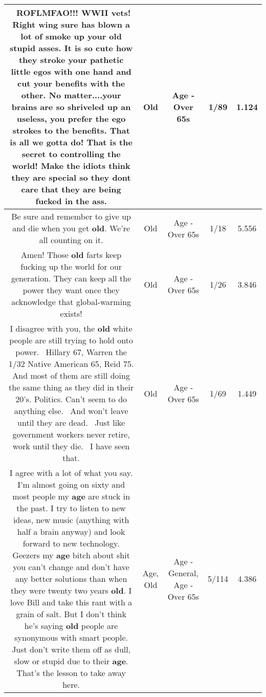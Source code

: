 \documentclass[11pt]{article}
\newlength\mylength
\begin{document}
\begin{center}
\begin{longtable}{|C{.65\mylength}|C{.30\mylength}|C{.12\mylength}|C{.12\mylength}|C{.12\mylength}|}
  \small {} ROFLMFAO!!! WWII vets! Right wing sure has blown a lot of smoke up your \textbf{old} stupid asses. It is so cute how they stroke your pathetic little egos with one hand and cut your benefits with the other. No matter....your brains are so shriveled up an useless, you prefer the ego strokes to the benefits. That is all we gotta do! That is the secret to controlling the world! Make the idiots think they are special so they dont care that they are being fucked in the ass.\normalsize   & Old & Age - Over 65s & 1/89 & 1.124 \\  \hline
  \small Be sure and remember to give up and die when you get \textbf{old}. We're all counting on it.\normalsize   & Old & Age - Over 65s & 1/18 & 5.556 \\  \hline
  \small Amen! Those \textbf{old} farts keep fucking up the world for our generation. They can keep all the power they want once they acknowledge that global-warming exists!\normalsize   & Old & Age - Over 65s & 1/26 & 3.846 \\  \hline
  \small I disagree with you, the \textbf{old} white people are still trying to hold onto power.  Hillary 67, Warren the 1/32 Native American 65, Reid 75. And most of them are still doing the same thing as they did in their 20's. Politics. Can't seem to do anything else.  And won't leave until they are dead.  Just like government workers never retire, work until they die.  I have seen that.\normalsize   & Old & Age - Over 65s & 1/69 & 1.449 \\  \hline
  \small I agree with a lot of what you say. I'm almost going on sixty and most people my \textbf{age} are stuck in the past. I try to listen to new ideas, new music (anything with half a brain anyway) and look forward to new technology. Geezers my \textbf{age} bitch about shit you can't change and don't have any better solutions than when they were twenty two years \textbf{old}. I love Bill and take this rant with a grain of salt. But I don't think he's saying \textbf{old} people are synonymous with smart people. Just don't write them off as dull, slow or stupid due to their \textbf{age}. That's the lesson to take away here.\normalsize   & Age, Old & Age - General, Age - Over 65s & 5/114 & 4.386 \\  \hline

\end{longtable}
\end{center}
\end{document}
